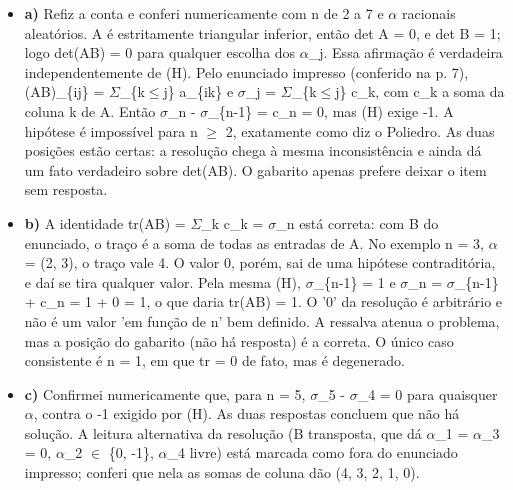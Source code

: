 \documentclass{article}%
\begin{document}
\begin{itemize}%
\item%
\textbf{a)} Refiz a conta e conferi numericamente com n de 2 a 7 e $\alpha$ racionais aleatórios. A é estritamente triangular inferior, então det A = 0, e det B = 1; logo det(AB) = 0 para qualquer escolha dos $\alpha$\_j. Essa afirmação é verdadeira independentemente de (H). Pelo enunciado impresso (conferido na p. 7), (AB)\_\{ij\} = $\Sigma$\_\{k$\leq$j\} a\_\{ik\} e $\sigma$\_j = $\Sigma$\_\{k$\leq$j\} c\_k, com c\_k a soma da coluna k de A. Então $\sigma$\_n - $\sigma$\_\{n-1\} = c\_n = 0, mas (H) exige -1. A hipótese é impossível para n $\geq$ 2, exatamente como diz o Poliedro. As duas posições estão certas: a resolução chega à mesma inconsistência e ainda dá um fato verdadeiro sobre det(AB). O gabarito apenas prefere deixar o item sem resposta.%
\item%
\textbf{b)} A identidade tr(AB) = $\Sigma$\_k c\_k = $\sigma$\_n está correta: com B do enunciado, o traço é a soma de todas as entradas de A. No exemplo n = 3, $\alpha$ = (2, 3), o traço vale 4. O valor 0, porém, sai de uma hipótese contraditória, e daí se tira qualquer valor. Pela mesma (H), $\sigma$\_\{n-1\} = 1 e $\sigma$\_n = $\sigma$\_\{n-1\} + c\_n = 1 + 0 = 1, o que daria tr(AB) = 1. O '0' da resolução é arbitrário e não é um valor 'em função de n' bem definido. A ressalva atenua o problema, mas a posição do gabarito (não há resposta) é a correta. O único caso consistente é n = 1, em que tr = 0 de fato, mas é degenerado.%
\item%
\textbf{c)} Confirmei numericamente que, para n = 5, $\sigma$\_5 - $\sigma$\_4 = 0 para quaisquer $\alpha$, contra o -1 exigido por (H). As duas respostas concluem que não há solução. A leitura alternativa da resolução (B transposta, que dá $\alpha$\_1 = $\alpha$\_3 = 0, $\alpha$\_2 $\in$ \{0, -1\}, $\alpha$\_4 livre) está marcada como fora do enunciado impresso; conferi que nela as somas de coluna dão (4, 3, 2, 1, 0).%
\end{itemize}%
\end{document}
